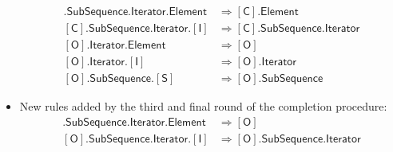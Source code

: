 \documentclass[a4paper,headsepline,bibliography=totoc,toc=flat,fleqn,twoside=semi]{scrbook}
\theoremstyle{definition}
\theoremstyle{definition}
\theoremstyle{definition}
\newcommand{\namesym}[1]{\mathsf{#1}}
\newcommand{\proto}[1]{\bm{\mathsf{#1}}}
\newcommand{\protosym}[1]{[\proto{#1}]}
\begin{document}
\begin{listing}
\begin{itemize}
\begin{align}
\protosym{C}.\namesym{SubSequence}.\namesym{Iterator}.\namesym{Element}&\Rightarrow\protosym{C}.\namesym{Element}\tag{15}\\
\protosym{C}.\namesym{SubSequence}.\namesym{Iterator}.\protosym{I}&\Rightarrow\protosym{C}.\namesym{SubSequence}.\namesym{Iterator}\tag{16}\\
\protosym{O}.\namesym{Iterator}.\namesym{Element}&\Rightarrow\protosym{O}\tag{17}\\
\protosym{O}.\namesym{Iterator}.\protosym{I}&\Rightarrow\protosym{O}.\namesym{Iterator}\tag{18}\\
\protosym{O}.\namesym{SubSequence}.\protosym{S}&\Rightarrow\protosym{O}.\namesym{SubSequence}\tag{19}
\end{align}
\item New rules added by the third and final round of the completion procedure:
\begin{align}
\protosym{O}.\namesym{SubSequence}.\namesym{Iterator}.\namesym{Element}&\Rightarrow\protosym{O}\tag{20}\\
\protosym{O}.\namesym{SubSequence}.\namesym{Iterator}.\protosym{I}&\Rightarrow\protosym{O}.\namesym{SubSequence}.\namesym{Iterator}\tag{21}
\end{align}
\end{itemize}
\end{listing}
\end{document}
